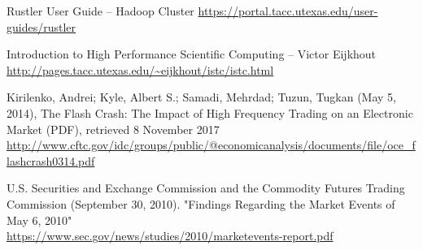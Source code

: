\documentclass[12pt]{article} %
\begin{document}
\begin{flushleft}
Rustler User Guide -- Hadoop Cluster \url{https://portal.tacc.utexas.edu/user-guides/rustler}

Introduction to High Performance Scientific Computing -- Victor Eijkhout \\ \url{http://pages.tacc.utexas.edu/~eijkhout/istc/istc.html}

Kirilenko, Andrei; Kyle, Albert S.; Samadi, Mehrdad; Tuzun, Tugkan (May 5, 2014), The Flash Crash: The Impact of High Frequency Trading on an Electronic Market (PDF), retrieved 8 November 2017 \\ \url{http://www.cftc.gov/idc/groups/public/@economicanalysis/documents/file/oce_flashcrash0314.pdf}

U.S. Securities and Exchange Commission and the Commodity Futures Trading Commission (September 30, 2010). "Findings Regarding the Market Events of May 6, 2010" \\ \url{https://www.sec.gov/news/studies/2010/marketevents-report.pdf}

\end{flushleft}
\end{document}
